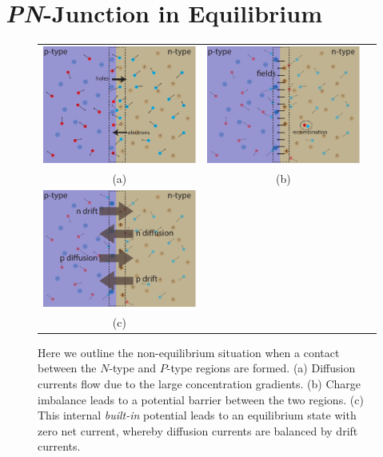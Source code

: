 \section{\emph{PN}-Junction in Equilibrium}
\begin{figure}[H]
\centering
\begin{tabular}{ccc}
\includegraphics[width=.45\columnwidth]{pn_flow1} &
\includegraphics[width=.45\columnwidth]{pn_flow2}\\
(a) & (b)\\
\includegraphics[width=.45\columnwidth]{pn_flow3}\\
(c)\\
\end{tabular}
\caption{Here we outline the non-equilibrium situation when a contact between the $N$-type and $P$-type regions are formed.  (a)  Diffusion currents flow due to the large concentration gradients.  (b)  Charge imbalance leads to a potential barrier between the two regions.  (c) This internal \emph{built-in} potential leads to an equilibrium state with zero net current, whereby diffusion currents are balanced by drift currents.}
\label{fig:slide9}
\end{figure}
